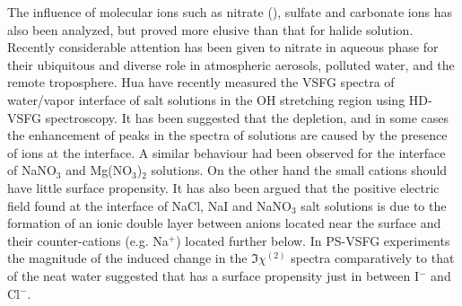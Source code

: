 The influence of molecular ions such as nitrate (\nitrate), sulfate­ and 
carbonate ions­ has also been analyzed, but proved more elusive than that for halide solution\cite{Gopalakrishnan2005,Salvador2003}.
Recently considerable attention has been given to nitrate in aqueous phase 
for their ubiquitous and diverse role in atmospheric aerosols, polluted water, 
and the remote troposphere\cite{Pitts2000,XuM2009,Jubb2012,Banerjee2016,Yadav2017b,Cochran2017,Yadav2017,Robinson2020}.
Hua \etal\cite{HuaWei2014} have recently measured the VSFG spectra of water/vapor interface of \LiN salt solutions in the OH stretching region
using HD-VSFG spectroscopy\cite{HuaWei2011,HuaWei2011b,ChenXiangKe2010}. 
It has been suggested that the depletion, and in some cases the enhancement of peaks in the spectra of
\LiN solutions are caused by the presence of ions at the interface.  
A similar behaviour had been observed for the interface of NaNO$_3$ and 
Mg(NO$_3$)$_2$ solutions\cite{Jubb2012,HuaWei2014}. 
On the other hand the small cations should have little surface propensity. 
It has also been argued that the positive electric field found at the interface of NaCl, NaI and 
NaNO$_3$ salt solutions is due to the formation of an ionic double layer 
between anions located near the surface and their counter-cations (e.g.
Na$^+$) located further below. In PS-VSFG experiments the 
magnitude of the induced change in the $\Im\chi^{(2)}$ spectra comparatively
to that of the neat water suggested that \nitrate has a surface propensity 
just in between I$^-$ and Cl$^-$\cite{Verreault2013,Verreault2009}. 


